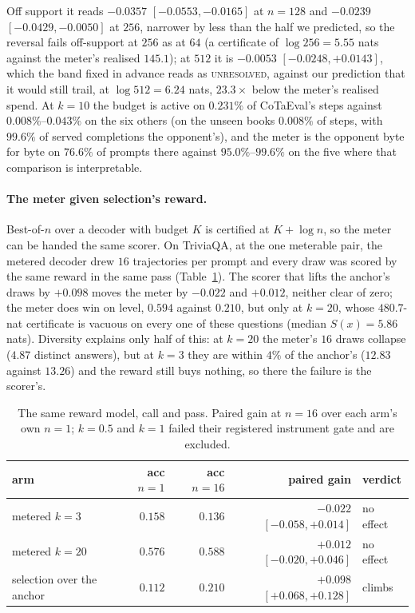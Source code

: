 Off support it reads $-0.0357$ $[-0.0553, -0.0165]$ at $n=128$ and $-0.0239$ $[-0.0429, -0.0050]$ at $256$,
narrower by less than the half we predicted, so the reversal fails off-support at $256$ as at $64$
(a certificate of $\log 256 = 5.55$ nats against the meter's realised $145.1$); at $512$ it is $-0.0053$
$[-0.0248, +0.0143]$, which the band fixed in advance reads as \textsc{unresolved}, against our prediction
that it would still trail, at $\log 512 = 6.24$ nats, $23.3\times$ below the meter's realised spend. At $k=10$ the budget is active on $0.231\%$ of CoTaEval's steps against $0.008\%$--$0.043\%$ on the six others (on the unseen books $0.008\%$ of steps, with $99.6\%$ of served completions the opponent's), and the meter is the opponent byte for byte on $76.6\%$ of prompts there against $95.0\%$--$99.6\%$ on the five where that comparison is interpretable.

\paragraph{The meter given selection's reward.}
Best-of-$n$ over a decoder with budget $K$ is certified at $K + \log n$, so the meter can be handed the same
scorer. On TriviaQA, at the one meterable pair, the metered decoder drew $16$ trajectories per prompt and
every draw was scored by the same reward in the same pass (Table~\ref{tab:parity}). The scorer that lifts the
anchor's draws by $+0.098$ moves the meter by $-0.022$ and $+0.012$, neither clear of zero; the meter does win on level, $0.594$ against $0.210$, but only at $k=20$, whose $480.7$-nat certificate is vacuous on every one of these questions (median $S(x) = 5.86$ nats). Diversity explains only half of this: at
$k=20$ the meter's $16$ draws collapse ($4.87$ distinct answers), but at $k=3$ they are within $4\%$ of the
anchor's ($12.83$ against $13.26$) and the reward still buys nothing, so there the failure is the
scorer's.

\begin{table}[ht]
\centering\footnotesize
\caption{The same reward model, call and pass. Paired gain at $n=16$ over each arm's own $n=1$; $k=0.5$ and
$k=1$ failed their registered instrument gate and are excluded.}
\label{tab:parity}
\setlength{\tabcolsep}{5pt}
\begin{tabular}{@{}lrrrl@{}}
\toprule
arm & acc $n{=}1$ & acc $n{=}16$ & paired gain & verdict \\
\midrule
metered $k{=}3$   & $0.158$ & $0.136$ & $-0.022$ $[-0.058, +0.014]$ & no effect \\
metered $k{=}20$  & $0.576$ & $0.588$ & $+0.012$ $[-0.020, +0.046]$ & no effect \\
selection over the anchor & $0.112$ & $0.210$ & $+0.098$ $[+0.068, +0.128]$ & climbs \\
\bottomrule
\end{tabular}
\end{table}

